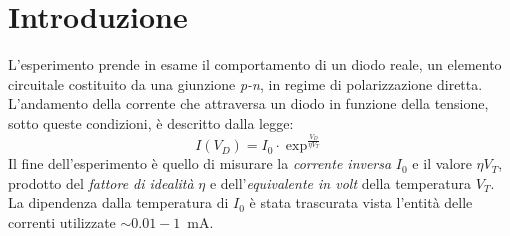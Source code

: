 \documentclass[@SRC@/main]{subfiles}
\begin{document}
\section{Introduzione} \label{sec:introduzione}
  L'esperimento prende in esame il comportamento di un diodo reale, un elemento circuitale
  costituito da una giunzione \textit{p-n}, in regime di polarizzazione diretta.
  L'andamento della corrente che attraversa un diodo in funzione della tensione,
  sotto queste condizioni, è descritto dalla legge:
  \begin{equation}
    \label{eq:caratteristiche}
    I(V_D) = I_0\cdot \exp^{\frac{V_D}{\eta V_T}}
  \end{equation}
  Il fine dell'esperimento è quello di misurare la \textit{corrente inversa} $I_0$ e il
  valore $\eta V_T$, prodotto del \textit{fattore di idealità} $\eta$ e
  dell'\textit{equivalente in volt} della temperatura $V_T$.
  La dipendenza dalla temperatura di $I_0$ è stata trascurata vista l'entità
  delle correnti utilizzate $\sim 0.01-1$~mA.
\end{document}
